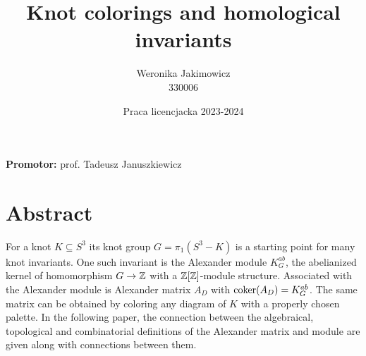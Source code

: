 \documentclass[14pt]{extarticle} %
\title{ {\bfseries Knot colorings and homological invariants}\\ \medskip {\normalsize(Kolorowania węzłów i niezmienniki homologiczne.)}}
\author{
  Weronika Jakimowicz\\
  330006
}
\date{\medskip Praca licencjacka 2023-2024}
\begin{document}
\maketitle
\bigskip

\begin{center}
  \large
  \textbf{Promotor:} prof. Tadeusz Januszkiewicz
\end{center}
\vspace{3cm}


\section*{\centering\normalsize Abstract}

{\small
For a knot $K\subseteq S^3$ its knot group $G=\pi_1(S^3-K)$ is a starting point for many knot invariants. One such invariant is the Alexander module $K_G^{ab}$, the abelianized kernel of homomorphism $G\to \operatorname{\mathbb{Z}}$ with a $\operatorname{\mathbb{Z}}[\operatorname{\mathbb{Z}}]$-module structure. Associated with the Alexander module is Alexander matrix $A_D$ with $\operatorname{coker}(A_D)= K_G^{ab}$. The same matrix can be obtained by coloring any diagram of $K$ with a properly chosen palette. In the following paper, the connection between the algebraical, topological and combinatorial definitions of the Alexander matrix and module are given along with connections between them.
%
}

\newpage



 
\newpage

\tableofcontents

\newpage


\end{document}
